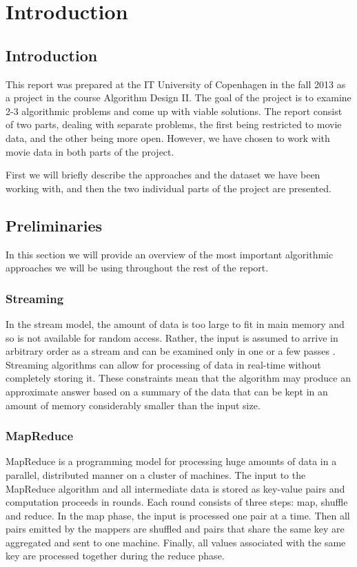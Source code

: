 \chapter{Introduction}
\section{Introduction}
This report was prepared at the IT University of Copenhagen in the fall 2013 as a project in the course Algorithm Design II. The goal of the project is to examine 2-3 algorithmic problems and come up with viable solutions. The report consist of two parts, dealing with separate problems, the first being restricted to movie data, and the other being more open. However, we have chosen to work with movie data in both parts of the project.

First we will briefly describe the approaches and the dataset we have been working with, and then the two individual parts of the project are presented.

\section{Preliminaries}
In this section we will provide an overview of the most important algorithmic approaches we will be using throughout the rest of the report. 

\subsection{Streaming}
In the stream model, the amount of data is too large to fit in main memory and so is not available for random access. Rather, the input is assumed to arrive in arbitrary order as a stream and can be examined only in one or a few passes \cite{data-streams}. Streaming algorithms can allow for processing of data in real-time without completely storing it. These constraints mean that the algorithm may produce an approximate answer based on a summary of the data that can be kept in an amount of memory considerably smaller than the input size. 
\subsection{MapReduce}
MapReduce is a programming model for processing huge amounts of data in a parallel, distributed manner on a cluster of machines\cite{filtering,text-processing}. The input to the MapReduce algorithm and all intermediate data is stored as key-value pairs and computation proceeds in rounds. Each round consists of three steps: map, shuffle and reduce. In the map phase, the input is processed one pair at a time. Then all pairs emitted by the mappers are shuffled and pairs that share the same key are aggregated and sent to one machine. Finally, all values associated with the same key are processed together during the reduce phase.

